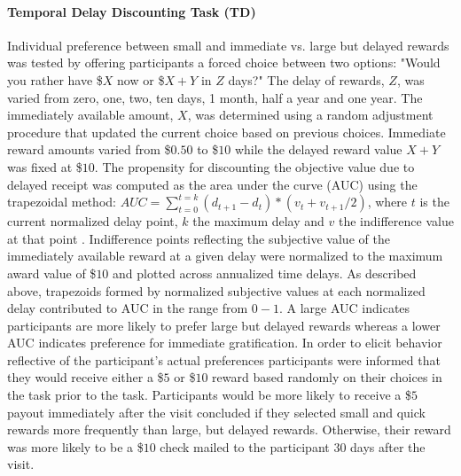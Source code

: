 \documentclass[utf8]{frontiersSCNS} %
\begin{document}
\paragraph{Temporal Delay Discounting Task (TD)} Individual preference between small and immediate vs. large but delayed rewards was tested by offering participants a forced choice between two options: "Would you rather have \$$X$ now or \$$X+Y$ in $Z$ days?" The delay of rewards, $Z$, was varied from zero, one, two, ten days, 1 month, half a year and one year. The immediately available amount, $X$, was determined using a random adjustment procedure that updated the current choice based on previous choices. Immediate reward amounts varied from \$$0.50$ to \$$10$ while the delayed reward value $X+Y$ was fixed at \$$10$. The propensity for discounting the objective value due to delayed receipt was computed as the area under the curve (AUC) using the trapezoidal method: $AUC = \sum_{t=0}^{t=k} (d_{t+1}-d_t)*(v_t+v_{t+1} /2)$, where $t$ is the current normalized delay point, $k$ the maximum delay and $v$ the indifference value at that point \citep{Borges2016,olson2007adolescents, myerson2001area}. Indifference points reflecting the subjective value of the immediately available reward at a given delay were normalized to the maximum award value of \$$10$ and plotted across annualized time delays. As described above, trapezoids formed by normalized subjective values at each normalized delay contributed to AUC in the range from $0-1$.  A large AUC indicates participants are more likely to prefer large but delayed rewards whereas a lower AUC indicates preference for immediate gratification. In order to elicit behavior reflective of the participant's actual preferences participants were informed that they would receive either a \$$5$ or \$$10$ reward based randomly on their choices in the task prior to the task. Participants would be more likely to receive a \$$5$ payout immediately after the visit concluded if they selected small and quick rewards more frequently than large, but delayed rewards. Otherwise, their reward was more likely to be a \$$10$ check mailed to the participant 30 days after the visit. 
\vspace{2pt}
\end{document}
